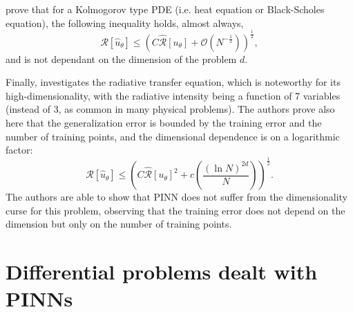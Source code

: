 \documentclass[pdflatex,sn-basic]{sn-jnl}%
\theoremstyle{thmstyleone}%
\theoremstyle{thmstyletwo}%
\theoremstyle{thmstylethree}%
\begin{document}



\cite{De2021_ErrorAnalysisPhysics_MisDRM} prove that for a Kolmogorov type PDE (i.e. heat equation or Black-Scholes equation), 
%
the following inequality holds, almost always,
\begin{equation*}
\mathcal{R}[\hat{u}_\theta]
\leq
\left(
C
\widehat{\mathcal{R}}[u_\theta] 
+ 
\mathcal{O}\left(N^{-\frac{1}{2}}\right)
\right)^{\frac{1}{2}},
\end{equation*}
and is not dependant on the dimension of the problem $d$.

Finally,
\cite{Mis2021_PhysicsInformedNeural_MolMM}
investigates the radiative transfer equation,  which is noteworthy for its high-dimensionality, with the radiative intensity being a function of 7 variables (instead of 3, as common in many physical problems).
The authors prove also here that the generalization error is bounded by the training error and the number of training points, and the dimensional dependence is on a logarithmic factor:
\begin{equation*}
\mathcal{R}[\hat{u}_\theta]
\leq
\left(
C
\widehat{\mathcal{R}}[u_\theta] ^2
+ 
c\left( \frac{(\ln N)^{2d}}{N}    \right)
\right)^{\frac{1}{2}}.
\end{equation*}
The authors are able to show that PINN does not suffer from the dimensionality curse for this problem, observing that the training error does not depend on the dimension but only on the number of training points.










\section{Differential problems dealt with PINNs}\label{sec4}
\end{document}
